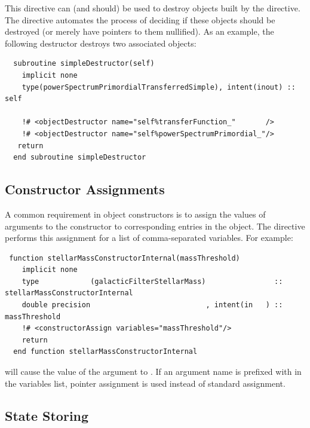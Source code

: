 This directive can (and should) be used to destroy objects built by the  directive. The  directive automates the process of deciding if these objects should be destroyed (or merely have pointers to them nullified). As an example, the following destructor destroys two associated objects:
\begin{lstlisting}  
  subroutine simpleDestructor(self)
    implicit none
    type(powerSpectrumPrimordialTransferredSimple), intent(inout) :: self

    !# <objectDestructor name="self%transferFunction_"       />
    !# <objectDestructor name="self%powerSpectrumPrimordial_"/>
   return
  end subroutine simpleDestructor
\end{lstlisting}

\subsection{Constructor Assignments}

A common requirement in object constructors is to assign the values of arguments to the constructor to corresponding entries in the object. The  directive performs this assignment for a list of comma-separated variables. For example:
\begin{lstlisting}  
 function stellarMassConstructorInternal(massThreshold)
    implicit none
    type            (galacticFilterStellarMass)                :: stellarMassConstructorInternal
    double precision                           , intent(in   ) :: massThreshold
    !# <constructorAssign variables="massThreshold"/>
    return
  end function stellarMassConstructorInternal
\end{lstlisting}
will cause the value of the  argument to . If an argument name is prefixed with \mono{\textasteriskcentered} in the variables list, pointer assignment is used instead of standard assignment.

\subsection{State Storing}

